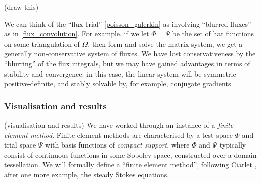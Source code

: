 \vskip 0.2in
(draw this)
\vskip 0.2in

We can think of the ``flux trial'' \eqref{poisson_galerkin} as involving ``blurred fluxes'' as in \eqref{flux_convolution}.
For example, if we let $\Phi = \Psi$ be the set of hat functions on some triangulation
of $\Omega$, then form and solve the matrix system, we get a generally non-conservative system of fluxes. We have lost conservativeness
by the ``blurring'' of the flux integrals, but we may have gained advantages in terms of stability and convergence: in this case,
the linear system will be symmetric-positive-definite, and stably solvable by, for example, conjugate gradients.

\subsubsection{Visualisation and results}
\vskip 0.2in
(visualisation and results)
\vskip 0.2in
We have worked through an instance of a \textit{finite element method}.
Finite element methods are characterised by a test space $\Phi$ and trial space
$\Psi$ with basis functions of \textit{compact support}, where $\Phi$ and $\Psi$ typically consist of continuous functions in
some Sobolev space, constructed over a domain tessellation. We will formally define a ``finite element method'', following Ciarlet \cite{ciarlet},
after one more example, the steady Stokes equations.


